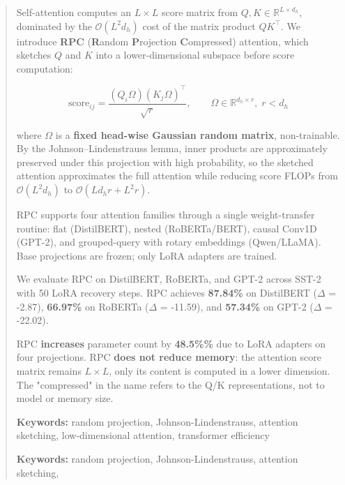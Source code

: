 \documentclass[10pt,twocolumn,letterpaper]{article}
\begin{document}
\maketitle

\begin{abstract}
Self-attention computes an $L \times L$ score matrix from $Q, K \in \mathbb{R}^{L \times d_h}$, 
dominated by the $\mathcal{O}(L^2 d_h)$ cost of the matrix product $Q K^\top$. 
We introduce \textbf{RPC} (\textbf{R}andom \textbf{P}rojection \textbf{C}ompressed) attention, 
which sketches $Q$ and $K$ into a lower-dimensional subspace before score 
computation:

\[
\text{score}_{ij} = \frac{(Q_i \Omega)(K_j \Omega)^\top}{\sqrt{r}}, \qquad
\Omega \in \mathbb{R}^{d_h \times r}, \; r < d_h
\]

where $\Omega$ is a \textbf{fixed head-wise Gaussian random matrix}, non-trainable. 
By the Johnson--Lindenstrauss lemma, inner products are approximately preserved 
under this projection with high probability, so the sketched attention 
approximates the full attention while reducing score FLOPs from 
$\mathcal{O}(L^2 d_h)$ to $\mathcal{O}(L d_h r + L^2 r)$.

RPC supports four attention families through a single weight-transfer 
routine: flat (DistilBERT), nested (RoBERTa/BERT), causal Conv1D (GPT-2), 
and grouped-query with rotary embeddings (Qwen/LLaMA). Base projections 
are frozen; only LoRA adapters are trained.

We evaluate RPC on DistilBERT, RoBERTa, and GPT-2 across SST-2 with 
50 LoRA recovery steps. RPC achieves \textbf{87.84\%} on 
DistilBERT ($\Delta$ = -2.87), \textbf{66.97\%} on RoBERTa ($\Delta$ = -11.59), 
and \textbf{57.34\%} on GPT-2 ($\Delta$ = -22.02).

RPC \textbf{increases} parameter count by \textbf{48.5\%\%} due to LoRA 
adapters on four projections. RPC \textbf{does not reduce memory}: the attention 
score matrix remains $L \times L$, only its content is computed in a lower 
dimension. The "compressed" in the name refers to the Q/K representations, 
not to model or memory size.

\textbf{Keywords:} random projection, Johnson-Lindenstrauss, attention sketching, 
low-dimensional attention, transformer efficiency



\vspace{0.5em}
\noindent\textbf{Keywords:} random projection, Johnson-Lindenstrauss, attention sketching,
\end{abstract}
\end{document}
